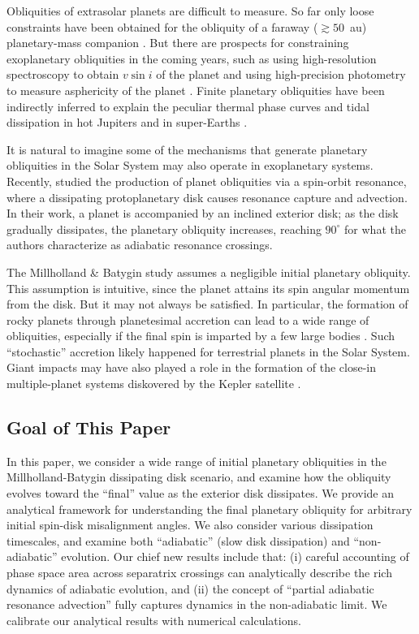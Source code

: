 \documentclass[twocolumn,twocolappendix]{aastex63}
\begin{document}
Obliquities of extrasolar planets are difficult to measure. So far only loose
constraints have been obtained for the obliquity of a faraway ($\gtrsim 50$~au)
planetary-mass companion \citep{bryan2020obliquity}. But there are prospects for
constraining exoplanetary obliquities in the coming years, such as using
high-resolution spectroscopy to obtain $v\sin i$ of the planet
\citep{snellen2014fast, bryan2018constraints} and using high-precision
photometry to measure asphericity of the planet \citep{seager2002constraining}.
Finite planetary obliquities have been indirectly inferred to explain the
peculiar thermal phase curves \citep[see e.g.][]{millholland_signatures,
ohno_infer_obl} and tidal dissipation in hot Jupiters
\citep{millholland_wasp12b} and in super-Earths
\citep{millholland2019obliquity}.

It is natural to imagine some of the mechanisms that generate planetary
obliquities in the Solar System may also operate in exoplanetary systems.
Recently, \citet{millholland_disk} studied the production of planet obliquities
via a spin-orbit resonance, where a dissipating protoplanetary disk causes
resonance capture and advection. In their work, a planet is accompanied by an
inclined exterior disk; as the disk gradually dissipates, the planetary
obliquity increases, reaching $90^\circ$ for what the authors characterize as
adiabatic resonance crossings.

The Millholland \& Batygin study assumes a negligible initial planetary
obliquity. This assumption is intuitive, since the planet attains its spin
angular momentum from the disk. But it may not always be satisfied. In
particular, the formation of rocky planets through planetesimal accretion can
lead to a wide range of obliquities, especially if the final spin is imparted by
a few large bodies \citep{dones1993does, lissauer1997accretion,
miguel2010planet}. Such ``stochastic'' accretion likely happened for terrestrial
planets in the Solar System. Giant impacts may have also played a role in the
formation of the close-in multiple-planet systems diskovered by the Kepler
satellite \citep[e.g.][]{inamdar2015formation, izidoro2017breaking}.

\subsection{Goal of This Paper}

In this paper, we consider a wide range of initial planetary obliquities in the
Millholland-Batygin dissipating disk scenario, and examine how the obliquity
evolves toward the ``final'' value as the exterior disk dissipates. We provide
an analytical framework for understanding the final planetary obliquity for
arbitrary initial spin-disk misalignment angles. We also consider various
dissipation timescales, and examine both ``adiabatic'' (slow disk dissipation)
and ``non-adiabatic'' evolution. \textcolor{Corr}{Our chief new results include
that: (i) careful accounting of phase space area across separatrix crossings can
analytically describe the rich dynamics of adiabatic evolution, and (ii) the
concept of ``partial adiabatic resonance advection'' fully captures dynamics in
the non-adiabatic limit.} We calibrate our analytical results with numerical
calculations.
\end{document}
